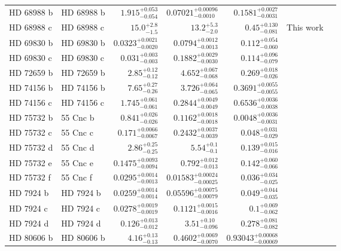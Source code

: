 \begin{longtable*}{llrrrrr}
HD 68988 b & HD 68988 b & $1.915^{+0.053}_{-0.054}$ & $0.07021^{+0.00096}_{-0.0010}$ & $0.1581^{+0.0027}_{-0.0031}$ & \cite{Vogt02} & \\
HD 68988 c & HD 68988 c & $15.0^{+2.8}_{-1.5}$ & $13.2^{+5.3}_{-2.0}$ & $0.45^{+0.130}_{-0.081}$ & This work & \\
HD 69830 b & HD 69830 b & $0.0323^{+0.0021}_{-0.0020}$ & $0.0794^{+0.0012}_{-0.0013}$ & $0.112^{+0.054}_{-0.060}$ & \cite{Lovis06} & \\
HD 69830 c & HD 69830 c & $0.031^{+0.003}_{-0.003}$ & $0.1882^{+0.0029}_{-0.0030}$ & $0.114^{+0.096}_{-0.079}$ & \cite{Lovis06} & \\
HD 72659 b & HD 72659 b & $2.85^{+0.12}_{-0.12}$ & $4.652^{+0.067}_{-0.068}$ & $0.269^{+0.018}_{-0.026}$ & \cite{Butler03} & \\
HD 74156 b & HD 74156 b & $7.65^{+0.27}_{-0.26}$ & $3.726^{+0.064}_{-0.065}$ & $0.3691^{+0.0055}_{-0.0055}$ & \cite{Naef04} & \\
HD 74156 c & HD 74156 c & $1.745^{+0.061}_{-0.061}$ & $0.2844^{+0.0049}_{-0.0049}$ & $0.6536^{+0.0036}_{-0.0038}$ & \cite{Naef04} & \\
HD 75732 b & 55 Cnc b & $0.841^{+0.026}_{-0.026}$ & $0.1162^{+0.0018}_{-0.0018}$ & $0.0048^{+0.0036}_{-0.0031}$ & \cite{Butler97} & \\
HD 75732 c & 55 Cnc c & $0.171^{+0.0066}_{-0.0067}$ & $0.2432^{+0.0037}_{-0.0039}$ & $0.048^{+0.031}_{-0.029}$ & \cite{McArthur04} & \\
HD 75732 d & 55 Cnc d & $2.86^{+0.25}_{-0.25}$ & $5.54^{+0.1}_{-0.1}$ & $0.139^{+0.015}_{-0.016}$ & \cite{Marcy02} & \\
HD 75732 e & 55 Cnc e & $0.1475^{+0.0093}_{-0.0094}$ & $0.792^{+0.012}_{-0.013}$ & $0.142^{+0.060}_{-0.066}$ & \cite{McArthur04} & \\
HD 75732 f & 55 Cnc f & $0.0295^{+0.0014}_{-0.0013}$ & $0.01583^{+0.00024}_{-0.00025}$ & $0.036^{+0.034}_{-0.025}$ & \cite{Fischer08} & \\
HD 7924 b & HD 7924 b & $0.0259^{+0.0014}_{-0.0014}$ & $0.05596^{+0.00075}_{-0.00079}$ & $0.049^{+0.044}_{-0.035}$ & \cite{Fulton15} & \\
HD 7924 c & HD 7924 c & $0.0278^{+0.0019}_{-0.0019}$ & $0.1121^{+0.0015}_{-0.0016}$ & $0.1^{+0.069}_{-0.062}$ & \cite{Fulton15} & \\
HD 7924 d & HD 7924 d & $0.126^{+0.013}_{-0.012}$ & $3.51^{+0.10}_{-0.096}$ & $0.278^{+0.081}_{-0.082}$ & \cite{Fulton15} & \\
HD 80606 b & HD 80606 b & $4.16^{+0.13}_{-0.13}$ & $0.4602^{+0.0069}_{-0.0070}$ & $0.93043^{+0.00068}_{-0.00069}$ & \cite{Wittenmyer07} & \\

\end{longtable*}
